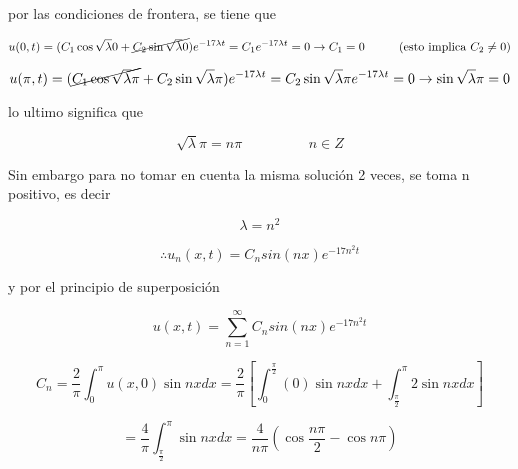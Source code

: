 \documentclass[12pt,a4paper]{article}
\begin{document}
\begin{enumerate}
    por las condiciones de frontera, se tiene que
    
    \begin{equation*}
        u(0,t) = (C_1\cos{\sqrt{\lambda}0}+\cancel{C_2\sin{\sqrt{\lambda}0}}) e^{-17\lambda t} = C_1 e^{-17\lambda t} = 0 \rightarrow C_1 = 0 \hspace{1cm} (\text{esto implica }  C_2 \neq 0)
    \end{equation*}
    
    \begin{equation*}
        u(\pi ,t) =(\cancel{C_1\cos{\sqrt{\lambda}\pi}}+C_2\sin{\sqrt{\lambda}\pi}) e^{-17\lambda t} = C_2 \sin{\sqrt{\lambda}\pi} e^{-17\lambda t} = 0 \rightarrow \sin{\sqrt{\lambda}\pi} = 0
    \end{equation*}
    
    lo ultimo significa que
    
    \begin{equation*}
        \sqrt{\lambda} \pi = n \pi \hspace{ 2cm} n \in Z
    \end{equation*}
    
    Sin embargo para no tomar en cuenta la misma solución 2 veces, se toma n positivo, es decir
    
    \begin{equation*}
        \lambda = n^2
    \end{equation*}
    
    \begin{equation*}
        \therefore u_n(x,t) = C_n sin{(nx)} e^{-17n^2 t}
    \end{equation*}
    
    y por el principio de superposición
    
    \begin{equation*}
        u(x,t) = \sum_{n = 1}^{\infty} C_n sin{(nx)} e^{-17n^2 t}
    \end{equation*}
    
    \begin{equation*}
        C_n = \frac{2}{\pi} \int_{0}^{\pi} u(x,0) \sin{nx}dx = \frac{2}{\pi}\left[\int_{0}^{\frac{\pi}{2}} (0) \sin{nx}dx + \int_{\frac{\pi}{2}}^{\pi} 2 \sin{nx}dx \right]
    \end{equation*}
    
    \begin{equation*}
        = \frac{4}{\pi} \int_{\frac{\pi}{2}}^{\pi} \sin{nx}dx = \frac{4}{n\pi} (\cos{\frac{n\pi}{2}}-\cos{n \pi})
    \end{equation*}
    

\end{enumerate}
\end{document}

